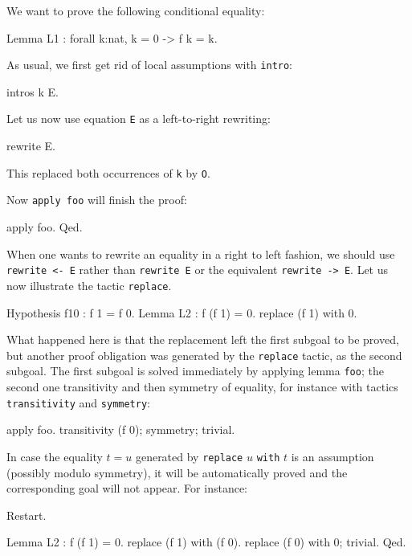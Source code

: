 \documentclass[11pt,a4paper]{book}
\begin{document}
We want to prove the following conditional equality:
\begin{coq_example*}
Lemma L1 : forall k:nat, k = 0 -> f k = k.
\end{coq_example*}

As usual, we first get rid of local assumptions with \verb:intro::
\begin{coq_example}
intros k E.
\end{coq_example}

Let us now use equation \verb:E: as a left-to-right rewriting:
\begin{coq_example}
rewrite E.
\end{coq_example}
This replaced both occurrences of \verb:k: by \verb:O:.

Now \verb:apply foo: will finish the proof:

\begin{coq_example}
apply foo.
Qed.
\end{coq_example}

When one wants to rewrite an equality in a right to left fashion, we should
use \verb:rewrite <- E: rather than \verb:rewrite E: or the equivalent
\verb:rewrite -> E:.
Let us now illustrate the tactic \verb:replace:.
\begin{coq_example}
Hypothesis f10 : f 1 = f 0.
Lemma L2 : f (f 1) = 0.
replace (f 1) with 0.
\end{coq_example}
What happened here is that the replacement left the first subgoal to be
proved, but another proof obligation was generated by the \verb:replace:
tactic, as the second subgoal. The first subgoal is solved immediately
by applying lemma \verb:foo:; the second one transitivity and then
symmetry of equality, for instance with tactics \verb:transitivity: and
\verb:symmetry::
\begin{coq_example}
apply foo.
transitivity (f 0); symmetry; trivial.
\end{coq_example}
In case the equality $t=u$ generated by \verb:replace: $u$ \verb:with:
$t$ is an assumption
(possibly modulo symmetry), it will be automatically proved and the
corresponding goal will not appear. For instance:

\begin{coq_eval}
Restart.
\end{coq_eval}
\begin{coq_example}
Lemma L2 : f (f 1) = 0.
replace (f 1) with (f 0).
replace (f 0) with 0; trivial.
Qed.
\end{coq_example}
\end{document}
